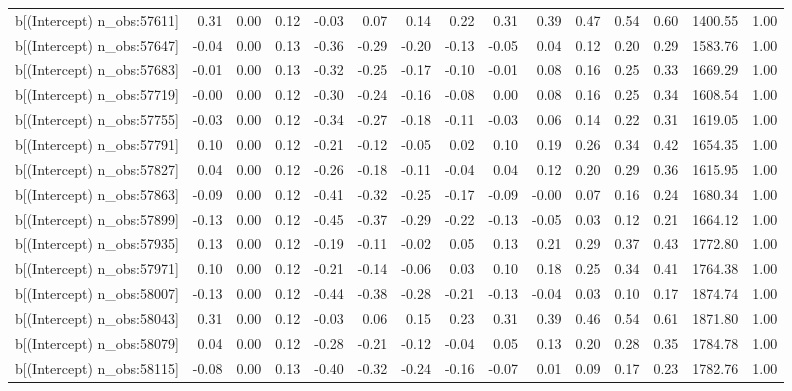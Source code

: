 \begin{table}[ht]
\begin{tabular}{rrrrrrrrrrrrrrr}
  b[(Intercept) n\_obs:57611] & 0.31 & 0.00 & 0.12 & -0.03 & 0.07 & 0.14 & 0.22 & 0.31 & 0.39 & 0.47 & 0.54 & 0.60 & 1400.55 & 1.00 \\ 
  b[(Intercept) n\_obs:57647] & -0.04 & 0.00 & 0.13 & -0.36 & -0.29 & -0.20 & -0.13 & -0.05 & 0.04 & 0.12 & 0.20 & 0.29 & 1583.76 & 1.00 \\ 
  b[(Intercept) n\_obs:57683] & -0.01 & 0.00 & 0.13 & -0.32 & -0.25 & -0.17 & -0.10 & -0.01 & 0.08 & 0.16 & 0.25 & 0.33 & 1669.29 & 1.00 \\ 
  b[(Intercept) n\_obs:57719] & -0.00 & 0.00 & 0.12 & -0.30 & -0.24 & -0.16 & -0.08 & 0.00 & 0.08 & 0.16 & 0.25 & 0.34 & 1608.54 & 1.00 \\ 
  b[(Intercept) n\_obs:57755] & -0.03 & 0.00 & 0.12 & -0.34 & -0.27 & -0.18 & -0.11 & -0.03 & 0.06 & 0.14 & 0.22 & 0.31 & 1619.05 & 1.00 \\ 
  b[(Intercept) n\_obs:57791] & 0.10 & 0.00 & 0.12 & -0.21 & -0.12 & -0.05 & 0.02 & 0.10 & 0.19 & 0.26 & 0.34 & 0.42 & 1654.35 & 1.00 \\ 
  b[(Intercept) n\_obs:57827] & 0.04 & 0.00 & 0.12 & -0.26 & -0.18 & -0.11 & -0.04 & 0.04 & 0.12 & 0.20 & 0.29 & 0.36 & 1615.95 & 1.00 \\ 
  b[(Intercept) n\_obs:57863] & -0.09 & 0.00 & 0.12 & -0.41 & -0.32 & -0.25 & -0.17 & -0.09 & -0.00 & 0.07 & 0.16 & 0.24 & 1680.34 & 1.00 \\ 
  b[(Intercept) n\_obs:57899] & -0.13 & 0.00 & 0.12 & -0.45 & -0.37 & -0.29 & -0.22 & -0.13 & -0.05 & 0.03 & 0.12 & 0.21 & 1664.12 & 1.00 \\ 
  b[(Intercept) n\_obs:57935] & 0.13 & 0.00 & 0.12 & -0.19 & -0.11 & -0.02 & 0.05 & 0.13 & 0.21 & 0.29 & 0.37 & 0.43 & 1772.80 & 1.00 \\ 
  b[(Intercept) n\_obs:57971] & 0.10 & 0.00 & 0.12 & -0.21 & -0.14 & -0.06 & 0.03 & 0.10 & 0.18 & 0.25 & 0.34 & 0.41 & 1764.38 & 1.00 \\ 
  b[(Intercept) n\_obs:58007] & -0.13 & 0.00 & 0.12 & -0.44 & -0.38 & -0.28 & -0.21 & -0.13 & -0.04 & 0.03 & 0.10 & 0.17 & 1874.74 & 1.00 \\ 
  b[(Intercept) n\_obs:58043] & 0.31 & 0.00 & 0.12 & -0.03 & 0.06 & 0.15 & 0.23 & 0.31 & 0.39 & 0.46 & 0.54 & 0.61 & 1871.80 & 1.00 \\ 
  b[(Intercept) n\_obs:58079] & 0.04 & 0.00 & 0.12 & -0.28 & -0.21 & -0.12 & -0.04 & 0.05 & 0.13 & 0.20 & 0.28 & 0.35 & 1784.78 & 1.00 \\ 
  b[(Intercept) n\_obs:58115] & -0.08 & 0.00 & 0.13 & -0.40 & -0.32 & -0.24 & -0.16 & -0.07 & 0.01 & 0.09 & 0.17 & 0.23 & 1782.76 & 1.00 \\ 

\end{tabular}
\end{table}
